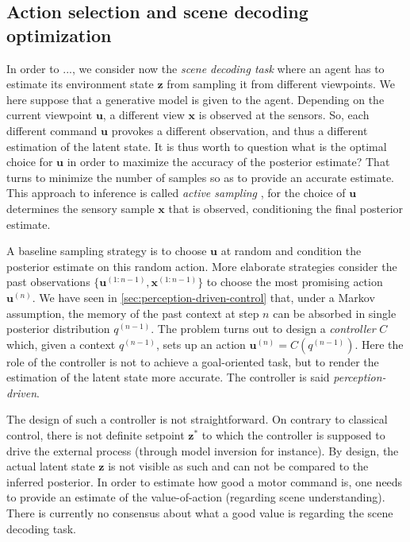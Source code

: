 \documentclass[12pt,twoside,openright]{article}
\begin{document}
\subsection{Action selection and scene decoding optimization}

{\color{blue}In order to ...}, we consider now the \emph{scene decoding task} where an agent has to estimate its environment state $\boldsymbol{z}$ from sampling it from different viewpoints. We here suppose that a generative model  is given to the agent. 
Depending on  the current viewpoint $\boldsymbol{u}$, a different view $\boldsymbol{x}$ is observed at the sensors. So, each different command $\boldsymbol{u}$ provokes a different observation, and thus a different 
estimation of the latent state. It is thus worth to question what is the optimal choice for $\boldsymbol{u}$ in order to maximize the accuracy of the posterior estimate?
That turns  to minimize the number of samples so as to provide an accurate estimate. This approach to inference is called \emph{active sampling} \cite{friston2012perceptions}, for the choice of $\boldsymbol{u}$ determines the sensory sample $\boldsymbol{x}$ that is observed, conditioning the final posterior estimate.

A baseline sampling strategy is to choose $\boldsymbol{u}$ at random and condition the posterior  estimate on this random action. 
More elaborate strategies consider the past observations $\{\boldsymbol{u}^{(1:n-1)}, \boldsymbol{x}^{(1:n-1)}\}$ to choose the most promising action $\boldsymbol{u}^{(n)}$. We have seen in  \ref{sec:perception-driven-control} that, under a Markov assumption, the memory of the past context
at step $n$ can be absorbed in single posterior distribution $q^{(n-1)}$.  The problem turns out to design  a \emph{controller} $C$ which, given a context $q^{(n-1)}$, sets up an action $\boldsymbol{u}^{(n)} = C(q^{(n-1)})$. Here the role of the controller is not to achieve a goal-oriented task, but to render the estimation of the latent state more accurate. The controller is said \emph{perception-driven}. 

The design of such a controller is not straightforward. On contrary to classical control, there is not definite setpoint $\boldsymbol{z}^*$ to which the controller is supposed to drive the external process (through model inversion for instance). By design, the actual latent state $\boldsymbol{z}$ is not visible as such and can not be compared to the inferred posterior. In order to estimate how good a motor command is, one needs to provide an estimate of the value-of-action (regarding scene understanding). There is currently no consensus about what a good value is regarding the scene decoding task. 
\end{document}
